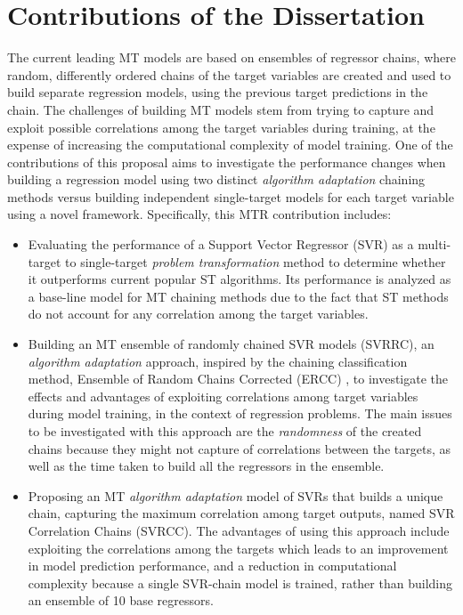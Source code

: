 \documentclass[reqno]{vcuthesis}
\newcommand{\iitem}{\item[-]}
\numberwithin{equation}{chapter}
\begin{document}
\section{Contributions of the Dissertation \label{sec:introcontribute} }
The current leading MT models are based on ensembles of regressor chains, where random, differently ordered chains of the target variables are created and used to build separate regression models, using the previous target predictions in the chain. The challenges of building MT models stem from trying to capture and exploit possible correlations among the target variables during training, at the expense of increasing the computational complexity of model training. One of the contributions of this proposal aims to investigate the performance changes when building a regression model using two distinct \textit{algorithm adaptation} chaining methods versus building independent single-target models for each target variable using a novel framework. Specifically, this MTR contribution includes:
\begin{itemize}
\iitem Evaluating the performance of a Support Vector Regressor (SVR) as a multi-target to single-target \textit{problem transformation} method to determine whether it outperforms current popular ST algorithms. Its performance is analyzed as a base-line model for MT chaining methods due to the fact that ST methods do not account for any correlation among the target variables.
\newpage
\iitem Building an MT ensemble of randomly chained SVR models (SVRRC), an \textit{algorithm adaptation} approach, inspired by the chaining classification method, Ensemble of Random Chains Corrected (ERCC) {\cite{Spyromitros2014}}, to investigate the effects and advantages of exploiting correlations among target variables during model training, in the context of regression problems. The main issues to be investigated with this approach are the \textit{randomness} of the created chains because they might not capture of correlations between the targets, as well as the time taken to build all the regressors in the ensemble.

\iitem Proposing an MT \textit{algorithm adaptation} model of SVRs that builds a unique chain, capturing the maximum correlation among target outputs, named SVR Correlation Chains (SVRCC). The advantages of using this approach include exploiting the correlations among the targets which leads to an improvement in model prediction performance, and a reduction in computational complexity because a single SVR-chain model is trained, rather than building an ensemble of 10 base regressors.
\end{itemize}
\end{document}
